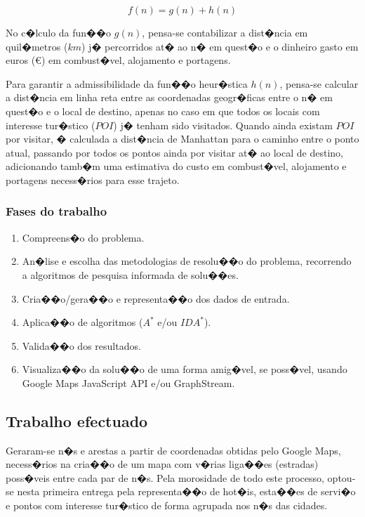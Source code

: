 \documentclass[a4paper,11pt]{article}
\begin{document}
\begin{equation}
f(n) = g(n) + h(n)
\end{equation}

No c�lculo da fun��o $g(n)$, pensa-se contabilizar a dist�ncia em quil�metros ($km$) j� percorridos at� ao n� em quest�o e o dinheiro gasto em euros (\euro) em combust�vel, alojamento e portagens.

Para garantir a admissibilidade da fun��o heur�stica $h(n)$, pensa-se calcular a dist�ncia em linha reta entre as coordenadas geogr�ficas entre o n� em quest�o e o local de destino, apenas no caso em que todos os locais com interesse tur�stico ($POI$) j� tenham sido visitados.
Quando ainda existam $POI$ por visitar, � calculada a dist�ncia de Manhattan para o caminho entre o ponto atual, passando por todos os pontos ainda por visitar at� ao local de destino, adicionando tamb�m uma estimativa do custo em combust�vel, alojamento e portagens necess�rios para esse trajeto.

\subsubsection{Fases do trabalho}
\begin{enumerate}
\item Compreens�o do problema.
\item An�lise e escolha das metodologias de resolu��o do problema, recorrendo a algoritmos de pesquisa informada de solu��es.
\item Cria��o/gera��o e representa��o dos dados de entrada.
\item Aplica��o de algoritmos ($A^*$ e/ou $IDA^*$).
\item Valida��o dos resultados.
\item Visualiza��o da solu��o de uma forma amig�vel, se poss�vel, usando Google Maps JavaScript API e/ou GraphStream.
\end{enumerate}

\subsection{Trabalho efectuado}

Geraram-se n�s e arestas a partir de coordenadas obtidas pelo Google Maps, necess�rios na cria��o de um mapa com v�rias liga��es (estradas) poss�veis entre cada par de n�s. Pela morosidade de todo este processo, optou-se nesta primeira entrega pela representa��o de hot�is, esta��es de servi�o e pontos com interesse tur�stico de forma agrupada nos n�s das cidades.
\end{document}

